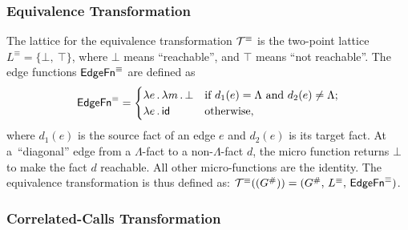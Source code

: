 
\subsubsection{Equivalence Transformation}\label{sec:equivtrans}

The lattice
for the equivalence transformation $\mathcal T^\equiv$ 
is the two-point lattice
    $L^\equiv=\{\bot,\ \top\}$,
where $\bot$ means ``reachable'', and $\top$ means ``not reachable''. 
The edge functions $\textsf{EdgeFn}^\equiv$ are defined as
\begin{equation}
    \textsf{EdgeFn}^\equiv=
    \begin{cases}
      \lambda e\,.\,\lambda m\,.\,\bot&\text{if $d_1(e)=\Lambda$ and $d_2(e)\ne\Lambda$;}\\
      \lambda e\,.\,\textsf{id}&\text{otherwise,}
    \end{cases}
\end{equation}
where $d_1(e)$ is the source fact of an edge $e$ and $d_2(e)$ is its target fact. 
At a~``diagonal'' edge from a $\Lambda$-fact to a non-$\Lambda$-fact
$d$, the micro function returns $\bot$
to make
the fact $d$ reachable. All other micro-functions are the identity.
The equivalence transformation is thus defined as:
  $\mathcal T^\equiv((G^\#))=(G^\#,\,L^\equiv,\,\mathsf{EdgeFn}^\equiv)$.


\subsubsection{Correlated-Calls Transformation}\label{sec:cctrans}

